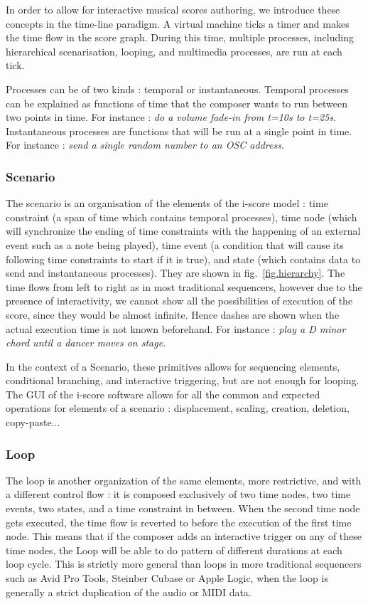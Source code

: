 \documentclass{article}
\begin{document}
In order to allow for interactive musical scores authoring, we introduce these concepts in the time-line paradigm.
A virtual machine ticks a timer and makes the time flow in the score graph. 
During this time, multiple processes, including hierarchical scenarisation, looping, and multimedia processes, are 
run at each tick. 

Processes can be of two kinds : temporal or instantaneous.
Temporal processes can be explained as functions of time that the composer wants to run between 
two points in time. 
For instance : \emph{do a volume fade-in from t=10s to t=25s}.~\\
Instantaneous processes are functions that will be run at a single point in time.
For instance : \emph{send a single random number to an OSC address}.

\subsubsection{Scenario}
The scenario is an organisation of the elements of the i-score model : time constraint (a span of time which contains temporal processes), time node (which will synchronize the ending of time constraints with the happening of an external event such as a note being played), time event (a condition that will cause its following time constraints to start if it is true), and state (which contains data to send and instantaneous processes).
They are shown in fig.~\ref{fig.hierarchy}. 
The time flows from left to right as in most traditional sequencers, however due to the presence of interactivity, we cannot show all the possibilities of execution of the score, since they would be almost infinite. 
Hence dashes are shown when the actual execution time is not known beforehand. 
For instance : \emph{play a D minor chord until a dancer moves on stage}.

In the context of a Scenario, these primitives allows for sequencing elements, conditional branching, and interactive triggering, but are not enough for looping.
The GUI of the i-score software allows for all the common and expected operations for elements of a scenario : displacement, scaling, creation, deletion, copy-paste...

\subsubsection{Loop}
The loop is another organization of the same elements, more restrictive, and with a different control flow : it is 
composed exclusively of two time nodes, two time events, two states, and a time constraint in between.
When the second time node gets executed, the time flow is reverted to before the execution of the first time node.
This means that if the composer adds an interactive trigger on any of these time nodes, the Loop will be able to do pattern of different durations at each loop cycle.
This is strictly more general than loops in more traditional sequencers such as Avid Pro Tools, Steinber Cubase or Apple Logic, when the loop is generally a strict duplication of the audio or MIDI data.
\end{document}
